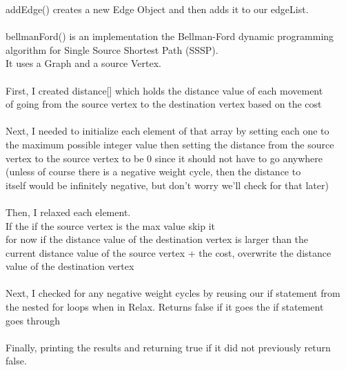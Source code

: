 \documentclass[letterpaper, 10pt]{article}
\begin{document}
addEdge() creates a new Edge Object and then adds it to our edgeList.\\
\\
bellmanFord() is an implementation the Bellman-Ford dynamic programming\\ algorithm for Single Source Shortest Path (SSSP).\\
It uses a Graph and a source Vertex.\\
\\
First, I created distance[] which holds the distance value of each movement\\
of going from the source vertex to the destination vertex based on the cost\\
\\
Next, I needed to initialize each element of that array by setting each one to\\
the maximum possible integer value then setting the distance from the source\\
vertex to the source vertex to be 0 since it should not have to go anywhere\\
(unless of course there is a negative weight cycle, then the distance to \\
itself would be infinitely negative, but don't worry we'll check for that later)\\
\\
Then, I relaxed each element. \\
If the if the source vertex is the max value skip it\\
for now if the distance value of the destination vertex is larger than the \\ current distance value of the source vertex + the cost, overwrite the distance\\
value of the destination vertex\\
\\
Next, I checked for any negative weight cycles by reusing our if statement from\\
the nested for loops when in Relax. Returns false if it goes the if statement \\
goes through\\
\\
Finally, printing the results and returning true if it did not previously return\\ false.\\
\end{document}
